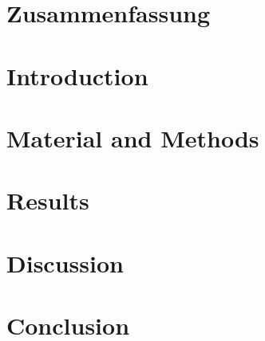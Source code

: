 \documentclass[
oneside,
a4paper,
12pt,
titlepage]
{article}
\begin{document}

\newpage


\newpage


\newpage

\section*{Zusammenfassung}


\pagestyle{standard}

\newpage
\section{Introduction}


\section{Material and Methods}








\section{Results}








\section{Discussion}







\section{Conclusion}


\newpage{}


\newpage{}

\end{document}
